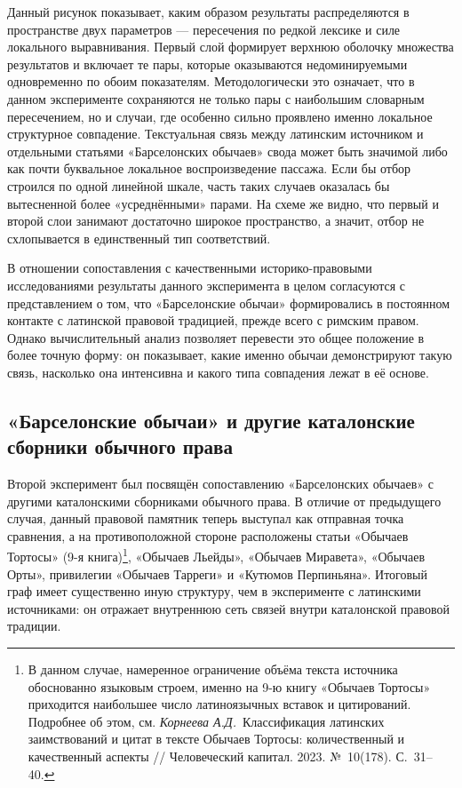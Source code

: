 Данный рисунок показывает, каким образом результаты распределяются в пространстве двух параметров --- пересечения по редкой лексике и силе локального выравнивания. Первый слой формирует верхнюю оболочку множества результатов и включает те пары, которые оказываются недоминируемыми одновременно по обоим показателям. Методологически это означает, что в данном эксперименте сохраняются не только пары с наибольшим словарным пересечением, но и случаи, где особенно сильно проявлено именно локальное структурное совпадение. Текстуальная связь между латинским источником и отдельными статьями «Барселонских обычаев» свода может быть значимой либо как почти буквальное локальное воспроизведение пассажа. Если бы отбор строился по одной линейной шкале, часть таких случаев оказалась бы вытесненной более «усреднёнными» парами. На схеме же видно, что первый и второй слои занимают достаточно широкое пространство, а значит, отбор не схлопывается в единственный тип соответствий.

В отношении сопоставления с качественными историко-правовыми исследованиями результаты данного эксперимента в целом согласуются с представлением о том, что «Барселонские обычаи» формировались в постоянном контакте с латинской правовой традицией, прежде всего с римским правом. Однако вычислительный анализ позволяет перевести это общее положение в более точную форму: он показывает, какие именно обычаи демонстрируют такую связь, насколько она интенсивна и какого типа совпадения лежат в её основе.

\subsection{«Барселонские обычаи» и другие каталонские сборники обычного права}

Второй эксперимент был посвящён сопоставлению «Барселонских обычаев» с другими каталонскими сборниками обычного права. В отличие от предыдущего случая, данный правовой памятник теперь выступал как отправная точка сравнения, а на противоположной стороне расположены статьи «Обычаев Тортосы» (9-я книга)\footnote{В данном случае, намеренное ограничение объёма текста источника обоснованно языковым строем, именно на 9-ю книгу «Обычаев Тортосы» приходится наибольшее число латиноязычных вставок и цитирований. Подробнее об этом, см. \emph{Корнеева А.Д.}~Классификация латинских заимствований и цитат в тексте Обычаев Тортосы: количественный и качественный аспекты // Человеческий капитал. 2023. №~10(178). С.~31--40.}, «Обычаев Льейды», «Обычаев Миравета», «Обычаев Орты», привилегии «Обычаев Тарреги» и «Кутюмов Перпиньяна». Итоговый граф имеет существенно иную структуру, чем в эксперименте с латинскими источниками: он отражает внутреннюю сеть связей внутри каталонской правовой традиции.

